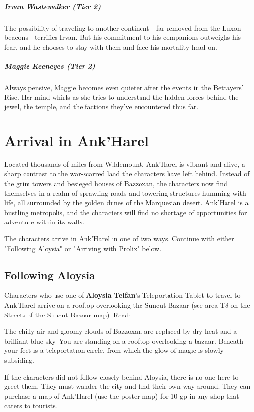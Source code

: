 \documentclass[10pt,a4paper,twoside,fancy,bg=print,twocolumn,openany,nodeprecatedcode]{dndbook}
\begin{document}
\subparagraph{Irvan Wastewalker (Tier 2)}
The possibility of traveling to another continent—far removed from the Luxon beacons—terrifies Irvan. But his commitment to his companions outweighs his fear, and he chooses to stay with them and face his mortality head-on.

\subparagraph{Maggie Keeneyes (Tier 2)}
Always pensive, Maggie becomes even quieter after the events in the Betrayers' Rise. Her mind whirls as she tries to understand the hidden forces behind the jewel, the temple, and the factions they've encountered thus far.

\section{Arrival in Ank'Harel}
Located thousands of miles from Wildemount, Ank'Harel is vibrant and alive, a sharp contrast to the war-scarred land the characters have left behind. Instead of the grim towers and besieged houses of Bazzoxan, the characters now find themselves in a realm of sprawling roads and towering structures humming with life, all surrounded by the golden dunes of the Marquesian desert. Ank'Harel is a bustling metropolis, and the characters will find no shortage of opportunities for adventure within its walls.

The characters arrive in Ank'Harel in one of two ways. Continue with either "Following Aloysia" or "Arriving with Prolix" below.

\subsection{Following Aloysia}
Characters who use one of \textbf{Aloysia Telfan}'s Teleportation Tablet to travel to Ank'Harel arrive on a rooftop overlooking the Suncut Bazaar (see area T8 on the Streets of the Suncut Bazaar map). Read:

\begin{DndReadAloud}{}
The chilly air and gloomy clouds of Bazzoxan are replaced by dry heat and a brilliant blue sky. You are standing on a rooftop overlooking a bazaar. Beneath your feet is a teleportation circle, from which the glow of magic is slowly subsiding.

\end{DndReadAloud}

If the characters did not follow closely behind Aloysia, there is no one here to greet them. They must wander the city and find their own way around. They can purchase a map of Ank'Harel (use the poster map) for 10 gp in any shop that caters to tourists.
\end{document}
